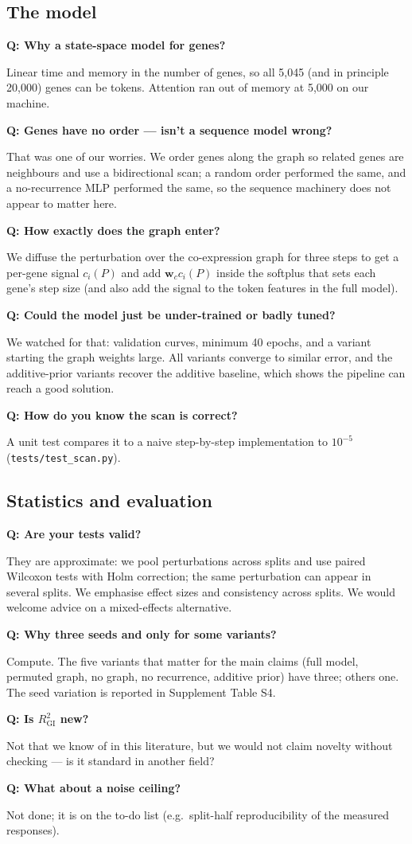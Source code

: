\documentclass[10.5pt]{article}
\newcommand{\qa}[2]{\par\medskip\noindent\textbf{Q: #1}\par\noindent #2\par}
\begin{document}
\subsection*{The model}
\qa{Why a state-space model for genes?}{Linear time and memory in the number of genes, so all 5,045 (and in
principle 20,000) genes can be tokens. Attention ran out of memory at 5,000 on our machine.}
\qa{Genes have no order --- isn't a sequence model wrong?}{That was one of our worries. We order genes along
the graph so related genes are neighbours and use a bidirectional scan; a random order performed the same, and
a no-recurrence MLP performed the same, so the sequence machinery does not appear to matter here.}
\qa{How exactly does the graph enter?}{We diffuse the perturbation over the co-expression graph for three steps
to get a per-gene signal $c_i(P)$ and add $\mathbf{w}_c c_i(P)$ inside the softplus that sets each gene's step
size (and also add the signal to the token features in the full model).}
\qa{Could the model just be under-trained or badly tuned?}{We watched for that: validation curves, minimum
40 epochs, and a variant starting the graph weights large. All variants converge to similar error, and the
additive-prior variants recover the additive baseline, which shows the pipeline can reach a good solution.}
\qa{How do you know the scan is correct?}{A unit test compares it to a naive step-by-step implementation to
$10^{-5}$ (\texttt{tests/test\_scan.py}).}

\subsection*{Statistics and evaluation}
\qa{Are your tests valid?}{They are approximate: we pool perturbations across splits and use paired Wilcoxon
tests with Holm correction; the same perturbation can appear in several splits. We emphasise effect sizes and
consistency across splits. We would welcome advice on a mixed-effects alternative.}
\qa{Why three seeds and only for some variants?}{Compute. The five variants that matter for the main claims
(full model, permuted graph, no graph, no recurrence, additive prior) have three; others one. The seed
variation is reported in Supplement Table S4.}
\qa{Is $R^2_{\mathrm{GI}}$ new?}{Not that we know of in this literature, but we would not claim novelty
without checking --- is it standard in another field?}
\qa{What about a noise ceiling?}{Not done; it is on the to-do list (e.g.\ split-half reproducibility of the
measured responses).}
\end{document}
